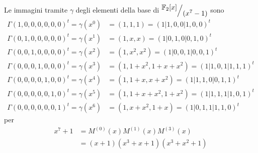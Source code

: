 \documentclass[mathserif]{beamer}
\def\quotient#1#2{%
   \raise1ex\hbox{$#1$}\Big/\lower1ex\hbox{$#2$}%
}
\begin{document}
\thispagestyle{empty}
\begin{frame}
   \vspace{-1.2cm}
    Le immagini tramite $\gamma$ degli elementi della base di $ \quotient{\mathbb{F}_{2} \lbrack x \rbrack  }{ (x^{7} - 1)}$ sono
    \begin{align*}
	\Gamma(1,0,0,0,0,0,0)^{t}  = \gamma(x^0) &= (1,1,1) =  (1|1,0,0|1,0,0)^{t}           \\
	\Gamma(0,1,0,0,0,0,0)^{t}  = \gamma(x^1) &= (1,x,x) = (1|0,1,0|0,1,0)^{t}            \\
	\Gamma(0,0,1,0,0,0,0)^{t}  = \gamma(x^2) &= (1,x^2,x^2) = (1|0,0,1|0,0,1)^{t}        \\
	\Gamma(0,0,0,1,0,0,0)^{t}  = \gamma(x^3) &= (1,1+x^2,1+x+x^2) = (1|1,0,1|1,1,1)^{t}  \\
	\Gamma(0,0,0,0,1,0,0)^{t}  = \gamma(x^4) &= (1,1+x,x+x^2) = (1|1,1,0|0,1,1)^{t}      \\
	\Gamma(0,0,0,0,0,1,0)^{t}  = \gamma(x^5) &= (1,1+x+x^2,1+x^2) = (1|1,1,1|1,0,1)^{t}  \\
	\Gamma(0,0,0,0,0,0,1)^{t}  = \gamma(x^6) &= (1,x+x^2,1+x) = (1|0,1,1|1,1,0)^{t}
    \end{align*}
    per
    \begin{align*}
      x^{7} + 1 &= M^{(0)}(x) M^{(1)}(x) M^{(3)}(x) \\
		&= (x+1)(x^3 + x + 1)(x^3 + x^2 + 1)
    \end{align*}
\end{frame}
\end{document}
